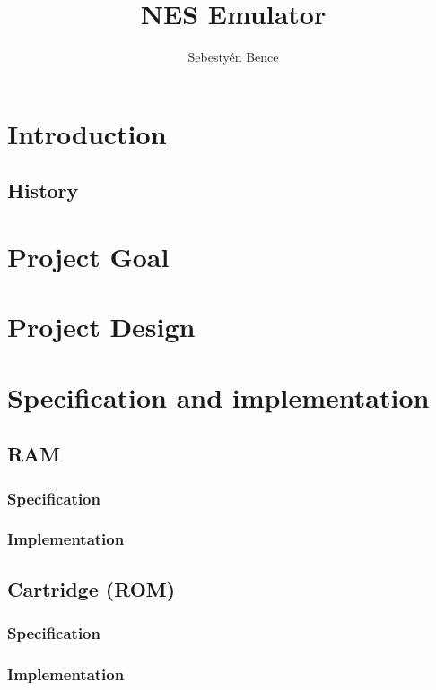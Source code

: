 \documentclass[]{report}
\title{NES Emulator}
\author{Sebestyén Bence}
\begin{document}
\maketitle

\tableofcontents

\clearpage

\chapter{Introduction}

\section{History}

\chapter{Project Goal}

\chapter{Project Design}

\chapter{Specification and implementation}

\section{RAM}

\subsection{Specification}


\subsection{Implementation}

\section{Cartridge (ROM)}

\subsection{Specification}

\subsection{Implementation}
\end{document}
